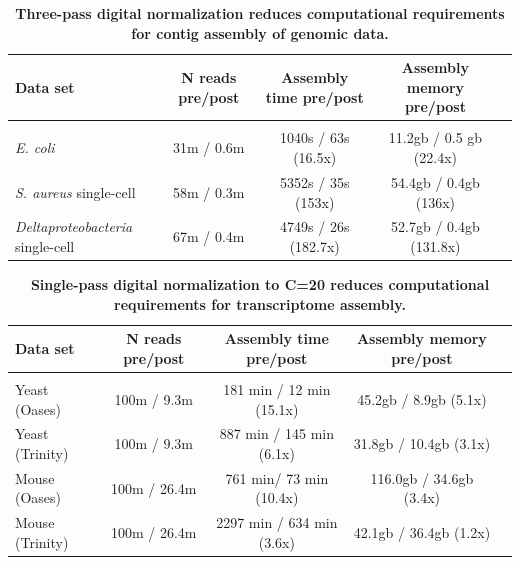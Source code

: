 \documentclass[10pt]{article}
\begin{document}

\begin{table}[!ht]
\caption{
\bf{Three-pass digital normalization reduces computational requirements for contig assembly of genomic data.}}
\begin{tabular}{|l|c|c|c|c|}

Data set & N reads pre/post & Assembly time pre/post & Assembly memory pre/post \\
\hline \\
{\em E. coli} & 31m / 0.6m & 1040s / 63s (16.5x) & 11.2gb / 0.5 gb (22.4x) \\ 
{\em S. aureus} single-cell & 58m / 0.3m & 5352s / 35s (153x) & 54.4gb / 0.4gb (136x) \\
{\em Deltaproteobacteria} single-cell & 67m / 0.4m & 4749s / 26s (182.7x) & 52.7gb / 0.4gb (131.8x) \\

\end{tabular}
\begin{flushleft}
\end{flushleft}
\label{tab:dngenome}
\end{table}




\begin{table}[!ht]
\caption{
\bf{Single-pass digital normalization to C=20 reduces computational
requirements for transcriptome assembly.}}


\begin{tabular}{|l|c|c|c|c|}

Data set & N reads pre/post & Assembly time pre/post & Assembly memory pre/post \\
 \hline \\
Yeast (Oases) & 100m / 9.3m & 181 min / 12 min (15.1x) & 45.2gb / 8.9gb (5.1x) \\
Yeast (Trinity) & 100m / 9.3m & 887 min / 145 min (6.1x) & 31.8gb / 10.4gb (3.1x) \\
Mouse (Oases) & 100m / 26.4m & 761 min/ 73 min (10.4x) & 116.0gb / 34.6gb (3.4x) \\
Mouse (Trinity) & 100m / 26.4m & 2297 min / 634 min (3.6x) & 42.1gb / 36.4gb (1.2x) \\
\end{tabular}

\begin{flushleft}
\end{flushleft}
\label{tab:dntrans}
\end{table}
\end{document}
